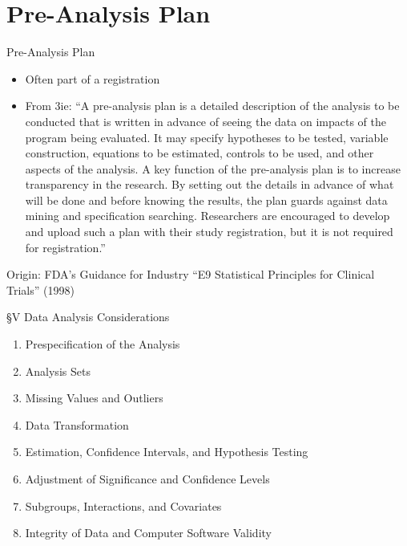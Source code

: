\documentclass{beamer}
\begin{document}
\section{Pre-Analysis Plan}
\begin{frame}{Pre-Analysis Plan}
\pause
\begin{itemize}
\item
Often part of a registration
\item
From 3ie: ``A pre-analysis plan is a detailed description of the analysis to be conducted that is written in advance of seeing the data on impacts of the program being evaluated. It may specify hypotheses to be tested, variable construction, equations to be estimated, controls to be used, and other aspects of the analysis. A key function of the pre-analysis plan is to increase transparency in the research. By setting out the details in advance of what will be done and before knowing the results, the plan guards against data mining and specification searching. Researchers are encouraged to develop and upload such a plan with their study registration, but it is not required for registration.''
\end{itemize}
\end{frame}
\begin{frame}{Origin: FDA's Guidance for Industry}
``E9 Statistical Principles for Clinical Trials'' (1998)
\href{http://www.fda.gov/downloads/drugs/guidancecomplianceregulatoryinformation/guidances/ucm073137.pdf}{}

\S V Data Analysis Considerations
\begin{enumerate}
\item Prespecification of the Analysis
\item Analysis Sets
\item Missing Values and Outliers
\item Data Transformation
\item Estimation, Confidence Intervals, and Hypothesis Testing
\item Adjustment of Significance and Confidence Levels
\item Subgroups, Interactions, and Covariates
\item Integrity of Data and Computer Software Validity
\end{enumerate}
\end{frame}
\end{document}

